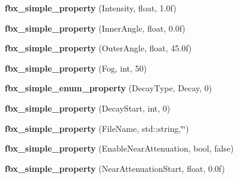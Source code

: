 \begin{DoxyCompactItemize}
\item 
\hypertarget{class_assimp_1_1_f_b_x_1_1_light_a38240c105e1b7054f48db35a275d9ab9}{{\bfseries fbx\+\_\+simple\+\_\+property} (Intensity, float, 1.\+0f)}\label{class_assimp_1_1_f_b_x_1_1_light_a38240c105e1b7054f48db35a275d9ab9}

\item 
\hypertarget{class_assimp_1_1_f_b_x_1_1_light_a524498193c05f2ade923693d995fdf3e}{{\bfseries fbx\+\_\+simple\+\_\+property} (Inner\+Angle, float, 0.\+0f)}\label{class_assimp_1_1_f_b_x_1_1_light_a524498193c05f2ade923693d995fdf3e}

\item 
\hypertarget{class_assimp_1_1_f_b_x_1_1_light_a1ecd310c49402b10e49a3f9ee4b943c4}{{\bfseries fbx\+\_\+simple\+\_\+property} (Outer\+Angle, float, 45.\+0f)}\label{class_assimp_1_1_f_b_x_1_1_light_a1ecd310c49402b10e49a3f9ee4b943c4}

\item 
\hypertarget{class_assimp_1_1_f_b_x_1_1_light_ad4c3754fb7cf9c78d78048794a150d8d}{{\bfseries fbx\+\_\+simple\+\_\+property} (Fog, int, 50)}\label{class_assimp_1_1_f_b_x_1_1_light_ad4c3754fb7cf9c78d78048794a150d8d}

\item 
\hypertarget{class_assimp_1_1_f_b_x_1_1_light_ac007d6628f8f3a886b92f969b25c9530}{{\bfseries fbx\+\_\+simple\+\_\+enum\+\_\+property} (Decay\+Type, Decay, 0)}\label{class_assimp_1_1_f_b_x_1_1_light_ac007d6628f8f3a886b92f969b25c9530}

\item 
\hypertarget{class_assimp_1_1_f_b_x_1_1_light_a73bd25308ee8b40212f90485c87ebe39}{{\bfseries fbx\+\_\+simple\+\_\+property} (Decay\+Start, int, 0)}\label{class_assimp_1_1_f_b_x_1_1_light_a73bd25308ee8b40212f90485c87ebe39}

\item 
\hypertarget{class_assimp_1_1_f_b_x_1_1_light_a01a34e6c4149a6108a05331ce2decc55}{{\bfseries fbx\+\_\+simple\+\_\+property} (File\+Name, std\+::string,\char`\"{}\char`\"{})}\label{class_assimp_1_1_f_b_x_1_1_light_a01a34e6c4149a6108a05331ce2decc55}

\item 
\hypertarget{class_assimp_1_1_f_b_x_1_1_light_abf0d09beed8dff7c81feddf288b3004f}{{\bfseries fbx\+\_\+simple\+\_\+property} (Enable\+Near\+Attenuation, bool, false)}\label{class_assimp_1_1_f_b_x_1_1_light_abf0d09beed8dff7c81feddf288b3004f}

\item 
\hypertarget{class_assimp_1_1_f_b_x_1_1_light_a9414cb44a11b28ba72d904d05b787b91}{{\bfseries fbx\+\_\+simple\+\_\+property} (Near\+Attenuation\+Start, float, 0.\+0f)}\label{class_assimp_1_1_f_b_x_1_1_light_a9414cb44a11b28ba72d904d05b787b91}


\end{DoxyCompactItemize}
